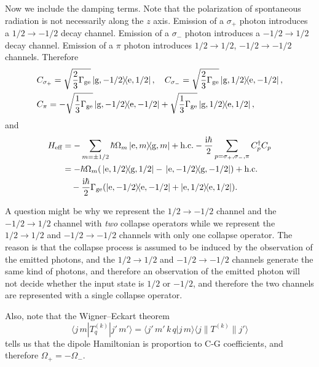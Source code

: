 \documentclass[hyperref, a4paper]{article}
\newcommand*{\ii}{\mathrm{i}}
\begin{document}
\begin{itemize}
Now we include the damping terms. Note that the polarization of spontaneous radiation is not necessarily 
along the $z$ axis. Emission of a $\sigma_+$ photon introduces a $1/2 \to -1/2$ decay channel. Emission of 
a $\sigma_-$ photon introduces a $-1/2 \to 1/2$ decay channel. Emission of a $\pi$ photon introduces
$1/2 \to 1/2$, $-1/2 \to -1/2$ channels. Therefore 
\begin{equation}
    \begin{aligned}
        &C_{\sigma_+} = \sqrt{\frac{2}{3} \Gamma_\text{ge}} \dyad*{\text{g}, -1/2}{\text{e}, 1/2} , \quad 
        C_{\sigma_-} = \sqrt{\frac{2}{3} \Gamma_\text{ge}} \dyad*{\text{g}, 1/2}{\text{e}, -1/2} , \\
        &C_{\pi} = - \sqrt{\frac{1}{3} \Gamma_\text{ge}} \dyad*{\text{g}, -1/2}{\text{e}, -1/2}
        + \sqrt{\frac{1}{3} \Gamma_\text{ge}} \dyad*{\text{g}, 1/2}{\text{e}, 1/2},
    \end{aligned}
\end{equation}
and 
\begin{equation}
    \begin{aligned}
        H_\text{eff} &= - \sum_{m = \pm 1/2} \hbar \Omega_m \dyad*{\text{e}, m}{\text{g}, m} + \text{h.c.} - \frac{\ii \hbar}{2} \sum_{p = \sigma_+, \sigma_-, \pi} C^\dagger_p C_p \\
        &= - \hbar \Omega_m (\dyad*{\text{e}, 1/2}{\text{g}, 1/2} - \dyad*{\text{e}, -1/2}{\text{g}, -1/2}) + \text{h.c.} \\
        &\quad - \frac{\ii \hbar}{2} \Gamma_\text{ge} (\dyad{\text{e}, -1/2} + \dyad{\text{e}, 1/2}).
    \end{aligned}
\end{equation}

\begin{note*}{}{}
    A question might be why we represent the $1/2 \to - 1/2$ channel and the $- 1/2 \to 1/2$ channel with 
    \emph{two} collapse operators while we represent the $1/2 \to 1/2$ and $-1/2 \to -1/2$ channels with 
    only one collapse operator. The reason is that the collapse process is assumed to be induced by 
    the observation of the emitted photons, and the $1/2 \to 1/2$ and $-1/2 \to -1/2$ channels generate
    the same kind of photons, and therefore an observation of the emitted photon will not decide whether 
    the input state is $1/2$ or $-1/2$, and therefore the two channels are represented with a single 
    collapse operator.

    Also, note that the Wigner–Eckart theorem 
    \begin{equation}
        \langle j\,m|T_{q}^{(k)}|j'\,m'\rangle =\langle j'\,m'\,k\,q|j\,m\rangle \langle j\|T^{(k)}\|j'\rangle
    \end{equation}
    tells us that the dipole Hamiltonian is proportion to C-G coefficients, and therefore $\Omega_+ = - \Omega_-$.
\end{note*}


\end{itemize}
\end{document}
